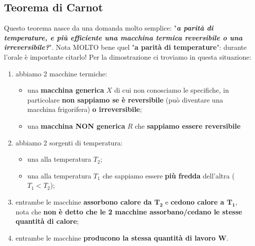         \subsection{Teorema di Carnot}
            Questo teorema nasce da una domanda molto semplice: "\textit{\textbf{a parità di temperature, e più efficiente una macchina termica reversibile o una irreversibile?}}". Nota MOLTO bene quel "\textbf{a parità di temperature}": durante l'orale è importante citarlo! Per la dimostrazione ci troviamo in questa situazione:
            \begin{enumerate}
                \item abbiamo 2 macchine termiche:
                \begin{itemize}
                    \item una \textbf{macchina generica} $X$ di cui non conosciamo le specifiche, in particolare \textbf{non sappiamo se è reversibile} (può diventare una macchina frigorifera) \textbf{o irreversibile};
                    \item una \textbf{macchina NON generica} $R$ che \textbf{sappiamo essere reversibile}
                \end{itemize}
                \item abbiamo 2 sorgenti di temperatura:
                \begin{itemize}
                    \item una alla temperatura $T_2$;
                    \item una alla temperatura $T_1$ che sappiamo essere \textbf{più fredda} dell'altra ($T_1<T_2$);
                \end{itemize}
                \item entrambe le macchine \textbf{assorbono calore da $\mathbf{T_2}$} e \textbf{cedono calore a $\mathbf{T_1}$}, nota che \textbf{non è detto che le 2 macchine assorbano/cedano le stesse quantità di calore};
                \item entrambe le macchine \textbf{producono la stessa quantità di lavoro $\mathbf{W}$}.
            \end{enumerate}

